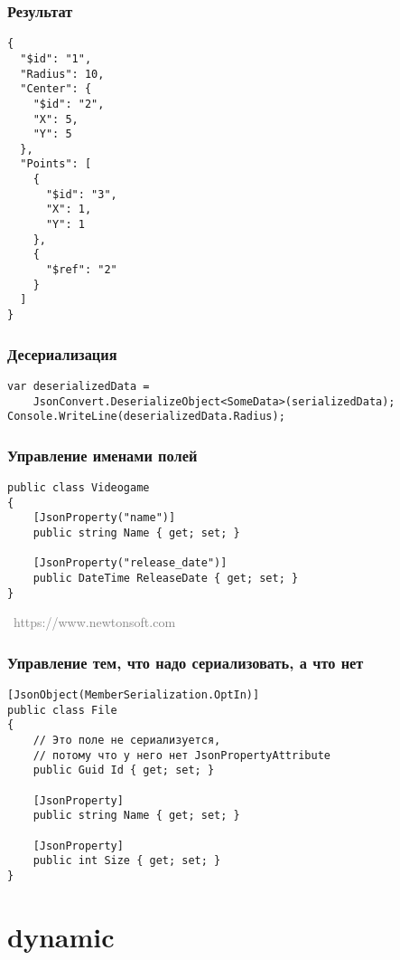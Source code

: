 \documentclass[xetex,mathserif,serif]{beamer}
\newcommand{\attribution}[1] {
\vspace{-5mm}\begin{flushright}\begin{scriptsize}\textcolor{gray}{\textcopyright\, #1}\end{scriptsize}\end{flushright}
}
\begin{document}
	\begin{frame}[fragile]
		\frametitle{Результат}
		\begin{footnotesize}
			\begin{verbatim}
{
  "$id": "1",
  "Radius": 10,
  "Center": {
    "$id": "2",
    "X": 5,
    "Y": 5
  },
  "Points": [
    {
      "$id": "3",
      "X": 1,
      "Y": 1
    },
    {
      "$ref": "2"
    }
  ]
}
			\end{verbatim}
		\end{footnotesize}
	\end{frame}

	\begin{frame}[fragile]
		\frametitle{Десериализация}
		\begin{verbatim}
var deserializedData = 
    JsonConvert.DeserializeObject<SomeData>(serializedData);
Console.WriteLine(deserializedData.Radius);
		\end{verbatim}
	\end{frame}

	\begin{frame}[fragile]
		\frametitle{Управление именами полей}
		\begin{verbatim}
public class Videogame
{
    [JsonProperty("name")]
    public string Name { get; set; }

    [JsonProperty("release_date")]
    public DateTime ReleaseDate { get; set; }
}
		\end{verbatim}
		\attribution{https://www.newtonsoft.com}
	\end{frame}

	\begin{frame}[fragile]
		\frametitle{Управление тем, что надо сериализовать, а что нет}
		\begin{verbatim}
[JsonObject(MemberSerialization.OptIn)]
public class File
{
    // Это поле не сериализуется,
    // потому что у него нет JsonPropertyAttribute
    public Guid Id { get; set; }

    [JsonProperty]
    public string Name { get; set; }

    [JsonProperty]
    public int Size { get; set; }
}
		\end{verbatim}
	\end{frame}

	\section{dynamic}
\end{document}
